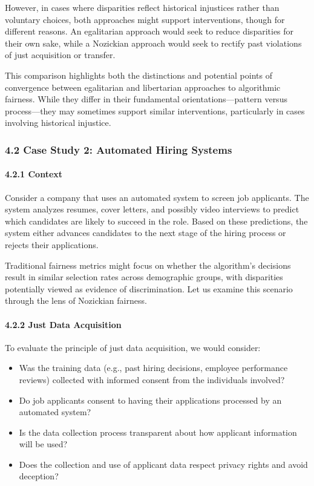 However, in cases where disparities reflect historical injustices rather
than voluntary choices, both approaches might support interventions,
though for different reasons. An egalitarian approach would seek to
reduce disparities for their own sake, while a Nozickian approach would
seek to rectify past violations of just acquisition or transfer.

This comparison highlights both the distinctions and potential points of
convergence between egalitarian and libertarian approaches to
algorithmic fairness. While they differ in their fundamental
orientations---pattern versus process---they may sometimes support
similar interventions, particularly in cases involving historical
injustice.

\subsubsection{4.2 Case Study 2: Automated Hiring
Systems}\label{case-study-2-automated-hiring-systems}

\paragraph{4.2.1 Context}\label{context-1}

Consider a company that uses an automated system to screen job
applicants. The system analyzes resumes, cover letters, and possibly
video interviews to predict which candidates are likely to succeed in
the role. Based on these predictions, the system either advances
candidates to the next stage of the hiring process or rejects their
applications.

Traditional fairness metrics might focus on whether the algorithm's
decisions result in similar selection rates across demographic groups,
with disparities potentially viewed as evidence of discrimination. Let
us examine this scenario through the lens of Nozickian fairness.

\paragraph{4.2.2 Just Data Acquisition}\label{just-data-acquisition-1}

To evaluate the principle of just data acquisition, we would consider:

\begin{itemize}
\tightlist
\item
  Was the training data (e.g., past hiring decisions, employee
  performance reviews) collected with informed consent from the
  individuals involved?
\item
  Do job applicants consent to having their applications processed by an
  automated system?
\item
  Is the data collection process transparent about how applicant
  information will be used?
\item
  Does the collection and use of applicant data respect privacy rights
  and avoid deception?
\end{itemize}

